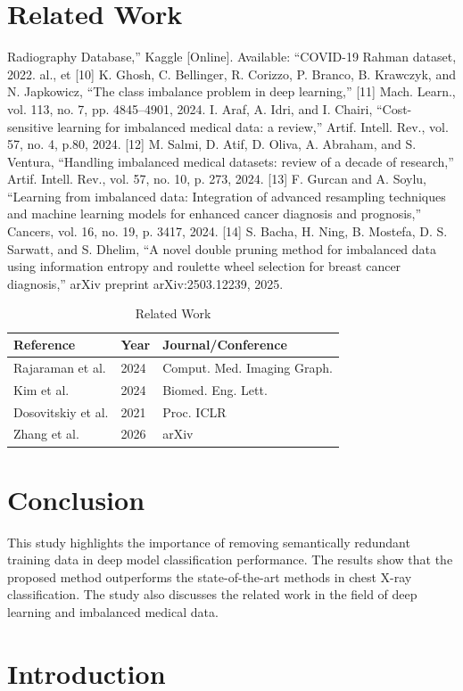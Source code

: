 \documentclass[final,5p,times,twocolumn,authoryear]{elsarticle}
\begin{document}
\section{Related Work}
Radiography Database,” Kaggle
[Online]. Available: “COVID-19 Rahman dataset, 2022. al., et [10] K. Ghosh, C. Bellinger, R. Corizzo, P. Branco, B. Krawczyk, and N. Japkowicz, “The class imbalance problem in deep learning,” [11] Mach. Learn., vol. 113, no. 7, pp. 4845–4901, 2024.
I. Araf, A. Idri, and I. Chairi, “Cost-sensitive learning for imbalanced medical data: a review,” Artif. Intell. Rev., vol. 57, no. 4, p.80, 2024. [12] M. Salmi, D. Atif, D. Oliva, A. Abraham, and S. Ventura, “Handling imbalanced medical datasets: review of a decade of research,” Artif. Intell. Rev., vol. 57, no. 10, p. 273, 2024. [13] F. Gurcan and A. Soylu, “Learning from imbalanced data: Integration of advanced resampling techniques and machine learning models for enhanced cancer diagnosis and prognosis,” Cancers, vol. 16, no. 19, p. 3417, 2024. [14] S. Bacha, H. Ning, B. Mostefa, D. S. Sarwatt, and S. Dhelim, “A novel double pruning method for imbalanced data using information entropy and roulette wheel selection for breast cancer diagnosis,” arXiv preprint arXiv:2503.12239, 2025.
\begin{table}[htbp]
\centering
\caption{Related Work}
\begin{tabular}{lll}
\hline
Reference & Year & Journal/Conference \\
\hline
Rajaraman et al. & 2024 & Comput. Med. Imaging Graph. \\
Kim et al. & 2024 & Biomed. Eng. Lett. \\
Dosovitskiy et al. & 2021 & Proc. ICLR \\
Zhang et al. & 2026 & arXiv \\
\hline
\end{tabular}
\end{table}
\section{Conclusion}
This study highlights the importance of removing semantically redundant training data in deep model classification performance. The results show that the proposed method outperforms the state-of-the-art methods in chest X-ray classification. The study also discusses the related work in the field of deep learning and imbalanced medical data.

\section{Introduction}
\end{document}
